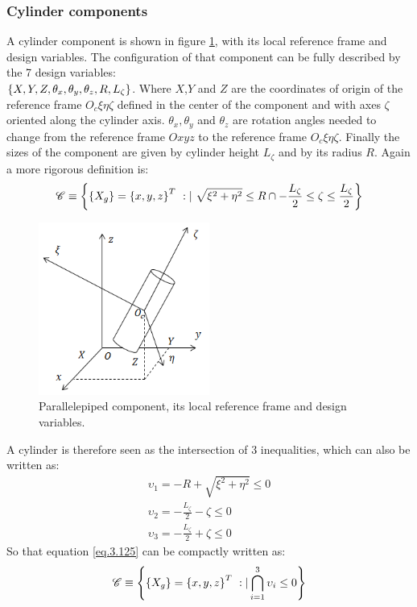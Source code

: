   \subsubsection{Cylinder components}
  A cylinder component is shown in figure \ref{fig:3.31}, with its local reference frame and design variables.
  The configuration of that component can be fully described by the 7 design variables:\\ $\left\lbrace{X,Y,Z,\theta_x ,\theta_y ,\theta_z ,R ,L_\zeta}\right \rbrace$. Where $X$,$Y$ and $Z$ are the coordinates of origin of the reference frame $O_c\xi \eta \zeta$ defined in the center of the component and with axes $\zeta$ oriented  along the cylinder axis. $\theta_x ,\theta_y$ and $\theta_z$ are rotation angles needed to change from the reference frame   $Oxyz$ to the reference frame $O_c\xi \eta \zeta$. Finally the sizes of the component are given by cylinder height  $L_\zeta$ and by its radius $R$. Again a more rigorous definition is:
    \begin{equation}
    \label{eq.3.125}
    \mathscr{C}\equiv\left\lbrace{\ensuremath\left\lbrace{X_g}\right \rbrace=\ensuremath\left\lbrace{x,y,z}\right \rbrace^T\ :| \ \sqrt{\xi^2+\eta^2}\leq R\cap-\frac{L_\zeta}{2}\leq\zeta\leq\frac{L_\zeta}{2}}\right \rbrace
    \end{equation}
     \begin{figure}[!ht]
     \centering
      \includegraphics[width=0.5\textwidth]{images/Ch3/cylinder_component}
    \caption{Parallelepiped component, its local reference frame and design variables.}
    \label{fig:3.31}       %
    \end{figure}
    A cylinder is therefore seen as the intersection of 3 inequalities, which can also be written as:
    \begin{eqnarray}
    \upsilon_1=-R+ \sqrt{\xi^2+\eta^2}\leq 0\\
        \upsilon_2=-\frac{L_\zeta}{2}-\zeta\leq 0\\
        \upsilon_3=-\frac{L_\zeta}{2}+\zeta\leq 0
    \end{eqnarray}
    So that equation \ref{eq.3.125} can be compactly written as:
    \begin{equation}
        \label{eq.3.129}
        \mathscr{C}\equiv\VectorVar{\VectorVar{X_g}=\VectorVar{x,y,z}^T\ :| \bigcap_{i=1}^3{\upsilon_i\leq 0}}
        \end{equation}
